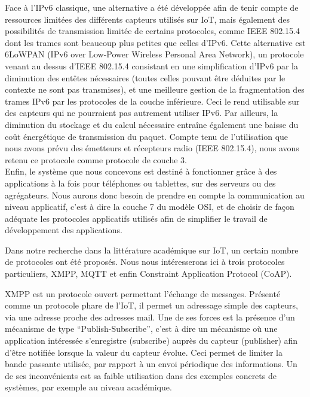 \documentclass{article}
\begin{document}
Face à l’IPv6 classique, une alternative a été développée afin de tenir compte de ressources limitées des différents capteurs utilisés sur IoT, mais également des possibilités de transmission limitée de certains protocoles, comme IEEE 802.15.4 dont les trames sont beaucoup plus petites que celles d’IPv6. Cette alternative est 6LoWPAN (IPv6 over Low-Power Wireless Personal Area Network), un protocole venant au dessus d’IEEE 802.15.4 consistant en une simplification d’IPv6 par la diminution des entêtes nécessaires (toutes celles pouvant être déduites par le contexte ne sont pas transmises), et une meilleure gestion de la fragmentation des trames IPv6 par les protocoles de la couche inférieure. Ceci le rend utilisable sur des capteurs qui ne pourraient pas autrement utiliser IPv6. Par ailleurs, la diminution du stockage et du calcul nécessaire entraîne également une baisse du coût énergétique de transmission du paquet. Compte tenu de l’utilisation que nous avons prévu des émetteurs et récepteurs radio (IEEE 802.15.4), nous avons retenu ce protocole comme protocole de couche 3.
\\

Enfin, le système que nous concevons est destiné à fonctionner grâce à des applications à la fois pour téléphones ou tablettes, sur des serveurs ou des agrégateurs. Nous aurons donc besoin de prendre en compte la communication au niveau applicatif, c’est à dire la couche 7 du modèle OSI, et de choisir de façon adéquate les protocoles applicatifs utilisés afin de simplifier le travail de développement des applications.

Dans notre recherche dans la littérature académique sur IoT, un certain nombre de protocoles ont été proposés. Nous nous intéresserons ici à trois protocoles particuliers, XMPP, MQTT et enfin Constraint Application Protocol (CoAP).

XMPP est un protocole ouvert permettant l’échange de messages. Présenté comme un protocole phare de l’IoT, il permet un adressage simple des capteurs, via une adresse proche des adresses mail. Une de ses forces est la présence d’un mécanisme de type “Publish-Subscribe”, c’est à dire un mécanisme où une application intéressée s’enregistre (subscribe) auprès du capteur (publisher) afin d’être notifiée lorsque la valeur du capteur évolue. Ceci permet de limiter la bande passante utilisée, par rapport à un envoi périodique des informations. Un de ses inconvénients est sa faible utilisation dans des exemples concrets de systèmes, par exemple au niveau académique.
\end{document}
